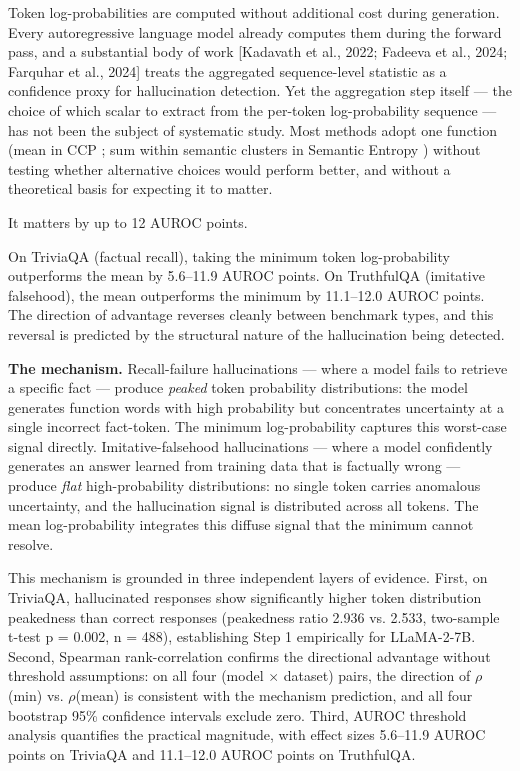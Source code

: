 
Token log-probabilities are computed without additional cost during generation. Every autoregressive language model already computes them during the forward pass, and a substantial body of work [Kadavath et al., 2022; Fadeeva et al., 2024; Farquhar et al., 2024] treats the aggregated sequence-level statistic as a confidence proxy for hallucination detection. Yet the aggregation step itself --- the choice of which scalar to extract from the per-token log-probability sequence --- has not been the subject of systematic study. Most methods adopt one function (mean in CCP \citep{Fadeeva2024Fact}; sum within semantic clusters in Semantic Entropy \citep{Farquhar2024}) without testing whether alternative choices would perform better, and without a theoretical basis for expecting it to matter.

It matters by up to 12 AUROC points.

On TriviaQA (factual recall), taking the minimum token log-probability outperforms the mean by 5.6--11.9 AUROC points. On TruthfulQA (imitative falsehood), the mean outperforms the minimum by 11.1--12.0 AUROC points. The direction of advantage reverses cleanly between benchmark types, and this reversal is predicted by the structural nature of the hallucination being detected.

\textbf{The mechanism.} Recall-failure hallucinations --- where a model fails to retrieve a specific fact --- produce \textit{peaked} token probability distributions: the model generates function words with high probability but concentrates uncertainty at a single incorrect fact-token. The minimum log-probability captures this worst-case signal directly. Imitative-falsehood hallucinations --- where a model confidently generates an answer learned from training data that is factually wrong --- produce \textit{flat} high-probability distributions: no single token carries anomalous uncertainty, and the hallucination signal is distributed across all tokens. The mean log-probability integrates this diffuse signal that the minimum cannot resolve.

This mechanism is grounded in three independent layers of evidence. First, on TriviaQA, hallucinated responses show significantly higher token distribution peakedness than correct responses (peakedness ratio 2.936 vs. 2.533, two-sample t-test p = 0.002, n = 488), establishing Step 1 empirically for LLaMA-2-7B. Second, Spearman rank-correlation confirms the directional advantage without threshold assumptions: on all four (model $\times$ dataset) pairs, the direction of $\rho$(min) vs. $\rho$(mean) is consistent with the mechanism prediction, and all four bootstrap 95\% confidence intervals exclude zero. Third, AUROC threshold analysis quantifies the practical magnitude, with effect sizes 5.6--11.9 AUROC points on TriviaQA and 11.1--12.0 AUROC points on TruthfulQA.

